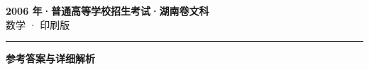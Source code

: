 \documentclass[zihao=5, a4paper]{ctexart}
\begin{document}
\begin{center}
  {\Large\bfseries 2006 年·普通高等学校招生考试·湖南卷文科}\\[4pt]
  {\large 数学 · 印刷版}
\end{center}
\medskip
{}

\par\bigskip\hrule\bigskip
{}
\begin{center}{\large\bfseries 参考答案与详细解析}\end{center}
\smallskip

\end{document}
